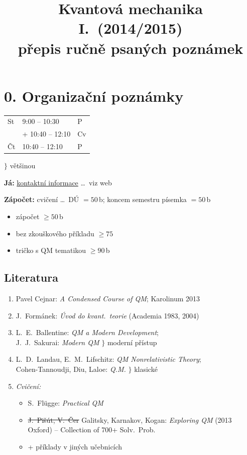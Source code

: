 \documentclass[11pt,a4paper]{article}
\title{Kvantová mechanika I.\ (2014/2015)\\[2pt]\large přepis ručně psaných poznámek}
\date{}
\begin{document}
\maketitle
\tableofcontents
\newpage

\section*{0. Organizační poznámky}

\begin{tabular}{lll}
St & 9:00 -- 10:30 & P \\
   & + 10:40 -- 12:10 & Cv \\
Čt & 10:40 -- 12:10 & P
\end{tabular}
\quad $\Big\}$ většinou

\textbf{Já:} \underline{kontaktní informace} \dots\ viz web

\textbf{Zápočet:} cvičení \dots\ DÚ $= 50$\,b; koncem semestru písemka $= 50$\,b
\begin{itemize}[nosep]
  \item zápočet $\geq 50$\,b
  \item bez zkouškového příkladu $\geq 75$
  \item tričko s QM tematikou $\geq 90$\,b
\end{itemize}

\subsection*{Literatura}
\begin{enumerate}[label=\arabic*)]
  \item Pavel Cejnar: \emph{A Condensed Course of QM}; Karolinum 2013
  \item J.\ Formánek: \emph{Úvod do kvant.\ teorie} (Academia 1983, 2004)
  \item L.\ E.\ Ballentine: \emph{QM a Modern Development}; \\
        J.\ J.\ Sakurai: \emph{Modern QM} \hfill $\Big\}$ moderní přístup
  \item L.\ D.\ Landau, E.\ M.\ Lifschitz: \emph{QM Nonrelativistic Theory}; \\
        Cohen-Tannoudji, Diu, Laloe: \emph{Q.M.} \hfill $\Big\}$ klasické
  \item \emph{Cvičení:}
  \begin{itemize}[nosep]
    \item S.\ Flügge: \emph{Practical QM}
    \item \sout{J.\ Pišút, V.\ Čer} Galitsky, Karnakov, Kogan: \emph{Exploring QM} (2013 Oxford) -- Collection of 700+ Solv.\ Prob.
    \item + příklady v jiných učebnicích
  \end{itemize}
\end{enumerate}
\end{document}
